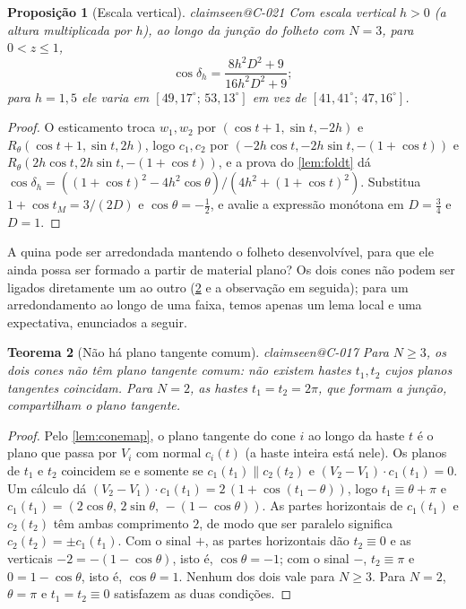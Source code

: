 \documentclass[11pt,a4paper]{article}
\makeatletter
\theoremstyle{plain}
\newtheorem{theorem}{Teorema}[section]
\newtheorem{proposition}[theorem]{Proposição}
\theoremstyle{remark}
\newcommand{\claim}[1]{\ifcsname claimseen@#1\endcsname\else\expandafter\gdef\csname claimseen@#1\endcsname{}\label{claim:#1}\fi}
\makeatother
\begin{document}
\begin{proposition}[Escala vertical]\label{prop:vscale}\claim{C-021}
Com escala vertical $h>0$ (a altura multiplicada por $h$), ao longo da junção do folheto com $N=3$, para $0<z\le1$,
\[ \cos\delta_h=\frac{8h^2D^2+9}{16h^2D^2+9}; \]
para $h=1{,}5$ ele varia em $[49{,}17^\circ;\,53{,}13^\circ]$ em vez de $[41{,}41^\circ;\,47{,}16^\circ]$.
\end{proposition}
\begin{proof}
O esticamento troca $w_1,w_2$ por $(\cos t+1,\sin t,-2h)$ e $R_\theta(\cos t+1,\sin t,2h)$, logo $c_1,c_2$ por
$(-2h\cos t,-2h\sin t,-(1+\cos t))$ e $R_\theta(2h\cos t,2h\sin t,-(1+\cos t))$, e a prova do \cref{lem:foldt} dá
$\cos\delta_h=((1+\cos t)^2-4h^2\cos\theta)/(4h^2+(1+\cos t)^2)$. Substitua $1+\cos t_M=3/(2D)$ e $\cos\theta=-\frac12$, e
avalie a expressão monótona em $D=\frac34$ e $D=1$.
\end{proof}

A quina pode ser arredondada mantendo o folheto desenvolvível, para que ele ainda possa ser formado a partir de material
plano? Os dois cones não podem ser ligados diretamente um ao outro (\cref{thm:nocommon} e a observação em seguida); para um
arredondamento ao longo de uma faixa, temos apenas um lema local e uma expectativa, enunciados a seguir.

\begin{theorem}[Não há plano tangente comum]\label{thm:nocommon}\claim{C-017}
Para $N\ge3$, os dois cones não têm plano tangente comum: não existem hastes $t_1,t_2$ cujos planos tangentes coincidam. Para
$N=2$, as hastes $t_1=t_2=2\pi$, que formam a junção, compartilham o plano tangente.
\end{theorem}
\begin{proof}
Pelo \cref{lem:conemap}, o plano tangente do cone $i$ ao longo da haste $t$ é o plano que passa por $V_i$ com normal $c_i(t)$
(a haste inteira está nele). Os planos de $t_1$ e $t_2$ coincidem se e somente se $c_1(t_1)\parallel c_2(t_2)$ e
$(V_2-V_1)\cdot c_1(t_1)=0$. Um cálculo dá $(V_2-V_1)\cdot c_1(t_1)=2\,(1+\cos(t_1-\theta))$, logo $t_1\equiv\theta+\pi$ e
$c_1(t_1)=(2\cos\theta,\,2\sin\theta,\,-(1-\cos\theta))$. As partes horizontais de $c_1(t_1)$ e $c_2(t_2)$ têm ambas
comprimento $2$, de modo que ser paralelo significa $c_2(t_2)=\pm c_1(t_1)$. Com o sinal $+$, as partes horizontais dão
$t_2\equiv0$ e as verticais $-2=-(1-\cos\theta)$, isto é, $\cos\theta=-1$; com o sinal $-$, $t_2\equiv\pi$ e $0=1-\cos\theta$,
isto é, $\cos\theta=1$. Nenhum dos dois vale para $N\ge3$. Para $N=2$, $\theta=\pi$ e $t_1=t_2\equiv0$ satisfazem as duas
condições.
\end{proof}
\end{document}

